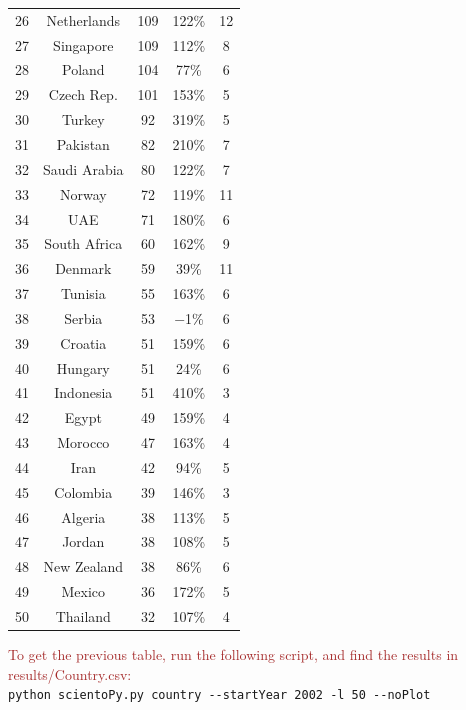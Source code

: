 \documentclass[symmetry,article,accept,moreauthors,pdftex10pt,a4paper]{mdpi}
\begin{document}
\begin{table}[H]
\begin{tabular}{ccccc}
		26 & Netherlands & 109 & 122\% & 12 \\
		27 & Singapore & 109 & 112\% & 8\\
		28 & Poland & 104 & 77\% & 6\\
		29 & Czech Rep. & 101 & 153\% & 5\\
		30 & Turkey & 92 & 319\% & 5\\
		31 & Pakistan & 82 & 210\% & 7\\
		32 & Saudi Arabia & 80 & 122\% & 7 \\
		 33 & Norway & 72 & 119\% & 11\\
		34 & UAE & 71 & 180\% & 6\\
		35 & South Africa & 60 & 162\% & 9  \\
		 36 & Denmark & 59 & 39\% & 11 \\
		37 & Tunisia & 55 & 163\% & 6 \\
		38 & Serbia & 53 & $-$1\% & 6 \\
		39 & Croatia & 51 & 159\% & 6 \\
		40 & Hungary & 51 & 24\% & 6 \\
		41 & Indonesia & 51 & 410\% & 3 \\
		42 & Egypt & 49 & 159\% & 4 \\
		43 & Morocco & 47 & 163\% & 4 \\
		44 & Iran & 42 & 94\% & 5 \\
		45 & Colombia & 39 & 146\% & 3 \\
		46 & Algeria & 38 & 113\% & 5 \\
		47 & Jordan & 38 & 108\% & 5 \\
		48 & New Zealand & 38 & 86\% & 6 \\
		49 & Mexico & 36 & 172\% & 5 \\
		50 & Thailand & 32 & 107\% & 4 \\
		\bottomrule
	\end{tabular}
\end{table}

\noindent
\textcolor{brown}{To get the previous table, run the following script, and find the results in results/Country.csv:}\\
\hspace*{0.5cm}\verb|python scientoPy.py country --startYear 2002 -l 50 --noPlot|\\
\end{document}
